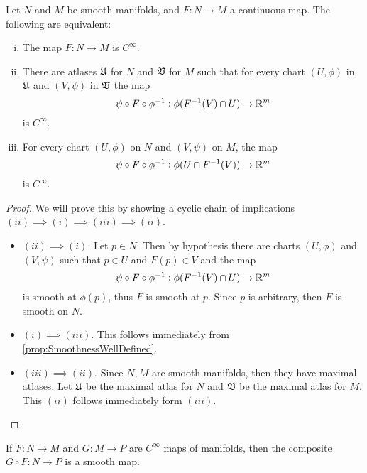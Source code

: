 \begin{proposition}
	\label{prop:smoothnessInTermsOfCharts}
	Let $ N $ and $ M $ be smooth manifolds, and $ F: N \to M $ a continuous map. The following are equivalent:
	\begin{enumerate}[(i)]
		\item The map $ F: N\to M $ is $ C^\infty $.
		\item There are atlases $ \frak{U} $ for $ N $ and $ \frak{V} $  for $ M $ such that for every chart $ (U,\phi) $ in $ \frak{U} $ and $ (V,\psi) $ in $ \frak{V} $ the map
		\[ \psi \circ F \circ \phi^{-1}: \phi(F^{-1}(V)\cap U) \to \mathbb{R}^m  \]
		is $ C^\infty $.
		\item For every chart $ (U,\phi) $ on $ N $ and $ (V,\psi) $ on $ M $, the map
		\[ \psi \circ F \circ \phi^{-1}: \phi(U \cap F^{-1}(V)) \to \mathbb{R}^m \]
		is $ C^\infty $.
	\end{enumerate}
\end{proposition}
\begin{proof}
	We will prove this by showing a cyclic chain of implications $ (ii)\implies (i)\implies (iii)\implies (ii) $.
	\begin{itemize}
		\item $ (ii)\implies (i) $. Let $ p \in N $. Then by hypothesis there are charts $ (U,\phi) $ and $ (V,\psi) $  such that $ p \in U $ and $ F(p) \in V $ and the map 
		\[ \psi \circ F \circ \phi^{-1}: \phi(F^{-1}(V)\cap U) \to \mathbb{R}^m \]
		is smooth at $ \phi(p) $, thus $ F $ is smooth at $ p $. Since $ p $ is arbitrary, then $ F $ is smooth on $ N $.
		\item $ (i) \implies (iii) $. This follows immediately from \autoref{prop:SmoothnessWellDefined}.
		\item $ (iii) \implies (ii) $. Since $ N, M $ are smooth manifolds, then they have maximal atlases. Let $ \frak{U} $ be the maximal atlas for $ N $ and $ \frak{V} $ be the maximal atlas for $ M $. This $ (ii) $ follows immediately form $ (iii) $.
		
	\end{itemize}
\end{proof}

\begin{proposition}
	If $ F:N\to M $ and $ G:M\to P $ are $ C^\infty $ maps of manifolds, then the composite $ G\circ F: N \to P $ is a smooth map.
\end{proposition}

